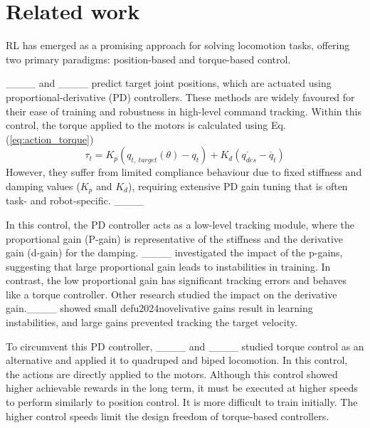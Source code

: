 \section{Related work}
RL has emerged as a promising approach for solving locomotion tasks, offering two primary paradigms: position-based and torque-based control.

____ and ____ predict target joint positions, which are actuated using proportional-derivative (PD) controllers. These methods are widely favoured for their ease of training and robustness in high-level command tracking. 
Within this control, the torque applied to the motors is calculated using Eq. (\ref{eq:action_torque})
\begin{equation}
\tau_t = K_p (q_{t,\ target}(\theta)- q_t) + K_d ( \dot{q_{des}} - \dot{q_t} ) \label{eq:action_torque}
\end{equation}
However, they suffer from limited compliance behaviour due to fixed stiffness and damping values (\(K_p\) and \(K_d\)), requiring extensive PD gain tuning that is often task- and robot-specific. ____ 

In this control, the PD controller acts as a low-level tracking module, where the proportional gain (P-gain) is representative of the stiffness and the derivative gain (d-gain) for the damping. ____ investigated the impact of the p-gains, suggesting that large proportional gain leads to instabilities in training. In contrast, the low proportional gain has significant tracking errors and behaves like a torque controller. Other research studied the impact on the derivative gain.____ showed small defu2024novelivative gains result in learning instabilities, and large gains prevented tracking the target velocity. 

To circumvent this PD controller, ____ and ____ studied torque control as an alternative and applied it to quadruped and biped locomotion. In this control, the actions are directly applied to the motors.
Although this control showed higher achievable rewards in the long term, it must be executed at higher speeds to perform similarly to position control. It is more difficult to train initially. The higher control speeds limit the design freedom of torque-based controllers. 

